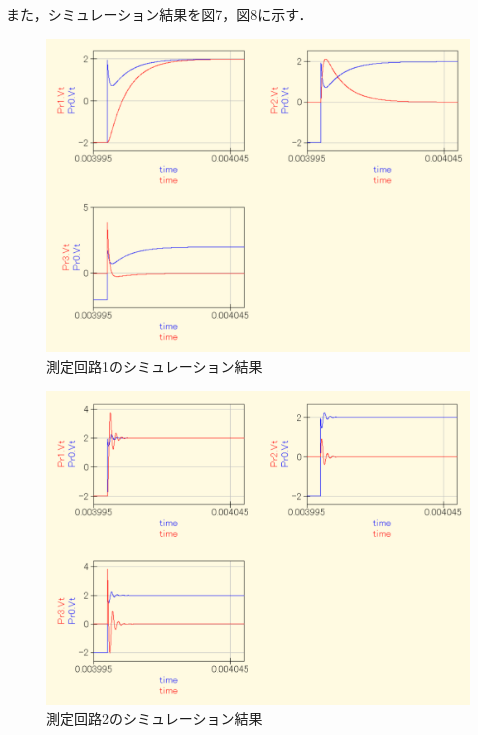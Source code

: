 \newpage

また，シミュレーション結果を図7，図8に示す．
\begin{figure}[H]
    \begin{center}
        \includegraphics[keepaspectratio, scale=0.475]{result1.pdf}
        \caption{測定回路1のシミュレーション結果}
    \end{center}
\end{figure}

\begin{figure}[H]
    \begin{center}
        \includegraphics[keepaspectratio, scale=0.475]{result2.pdf}
        \caption{測定回路2のシミュレーション結果}
    \end{center}
\end{figure}

